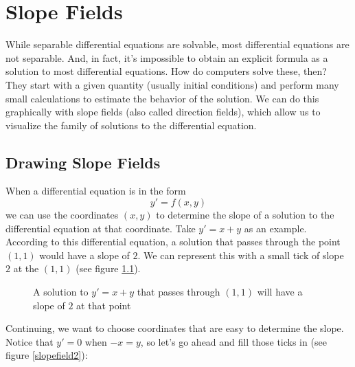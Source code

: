 \chapter{Slope Fields}

While separable differential equations are solvable, most differential 
equations are not separable. And, in fact, it's impossible to obtain an 
explicit formula as a solution to most differential equations. How do computers 
solve these, then? They start with a given quantity (usually initial 
conditions) and perform many small calculations to estimate the behavior of 
the solution. We can do this graphically with slope fields (also called 
direction fields), which allow us to visualize the family of solutions to the 
differential equation. 

\section{Drawing Slope Fields}
When a differential equation is in the form
$$y' = f(x,y)$$
we can use the coordinates $(x,y)$ to determine the slope of a solution to the 
differential equation at that coordinate. Take $y' = x + y$ as an example. 
According to this differential equation, a solution that passes through the 
point $(1, 1)$ would have a slope of $2$. We can represent this with a small 
tick of slope $2$ at the $(1, 1)$ (see figure \ref{slopefield1}). 

\begin{figure}[htbp]
\centering
    \caption{A solution to $y' = x + y$ that passes through $(1,1)$ will have 
    a slope of $2$ at that point}
    \label{slopefield1}
\end{figure}

Continuing, we want to choose coordinates that are easy to determine the slope. 
Notice that $y' = 0$ when $-x = y$, so let's go ahead and fill those ticks in 
(see figure \ref{slopefield2}):

